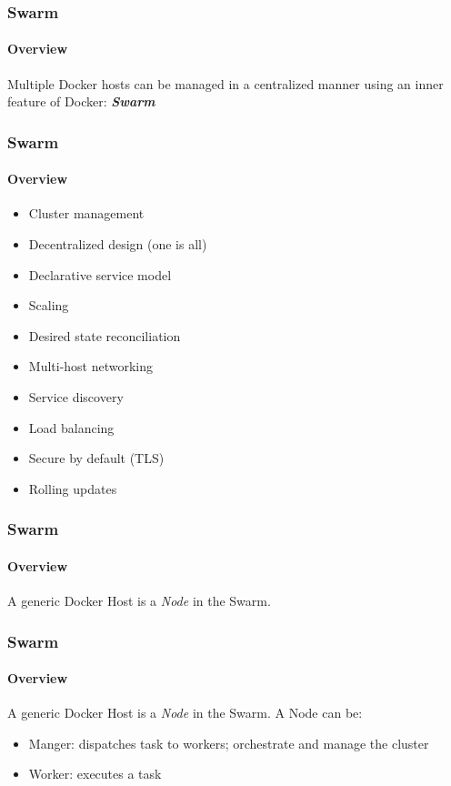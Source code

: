 \begin{frame}
\frametitle{Swarm}
\framesubtitle{Overview}
Multiple Docker hosts can be managed in a centralized manner using an inner feature of Docker: \textbf{\textit{Swarm}}
\end{frame}

\begin{frame}
\frametitle{Swarm}
\framesubtitle{Overview}
\begin{itemize}
\item Cluster management
\item Decentralized design (one is all)
\item Declarative service model
\item Scaling
\item Desired state reconciliation
\item Multi-host networking
\item Service discovery
\item Load balancing
\item Secure by default (TLS)
\item Rolling updates
\end{itemize}
\end{frame}

\begin{frame}
\frametitle{Swarm}
\framesubtitle{Overview}
A generic Docker Host is a \textit{Node} in the Swarm.
\end{frame}

\begin{frame}
\frametitle{Swarm}
\framesubtitle{Overview}
A generic Docker Host is a \textit{Node} in the Swarm.
\vspace{0.4}
A Node can be:
\begin{itemize}
\item Manger: dispatches task to workers; orchestrate and manage the cluster
\item Worker: executes a task  
\end{itemize}
\end{frame}